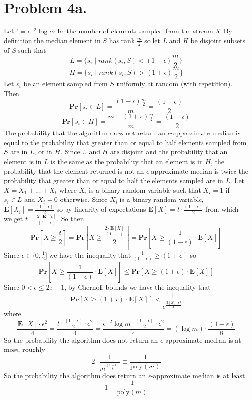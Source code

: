 \documentclass[12pt]{article}
\begin{document}
\section*{Problem 4a.}
Let $t=\epsilon^{-2} \log m$ be the number of elements
sampled from the stream $S$. By definition the median element in $S$ has rank
$\frac{m}{2}$ so let $L$ and $H$ be disjoint subsets of $S$ such that
$$L = \{s_i \mid rank(s_i, S) < (1-\epsilon)\frac{m}{2}\}$$
$$H = \{s_i \mid rank(s_i, S) > (1+\epsilon)\frac{m}{2}\}$$
Let $s_i$ be an element sampled from $S$ uniformly at random 
(with repetition). Then
$$\textbf{Pr}[s_i \in L] = \frac{(1-\epsilon)\frac{m}{2}}{m} =
\frac{(1-\epsilon)}{2}$$
$$\textbf{Pr}[s_i \in H] = \frac{m - (1+\epsilon)\frac{m}{2}}{m} =
\frac{(1-\epsilon)}{2}$$
The probability that the algorithm does not return an $\epsilon$-approximate
median is equal to the probability that greater than or equal to half
elements sampled from $S$ are in $L$, or in $H$. Since $L$ and $H$ are disjoint
and the probability that an element is in $L$ is the same as the probability
that an element is in $H$, the probability that the element returned
is not an $\epsilon$-approximate median is twice the probability that
greater than or equal to half the elements sampled are in $L$.
Let $X = X_1 + ... + X_t$ where $X_i$ is a binary random variable such
that $X_i = 1$ if $s_i \in L$ and $X_i = 0$ otherwise. Since $X_i$ is a binary
random variable, $\textbf{E}[X_i] = \frac{(1-\epsilon)}{2}$ so by linearity of
expectations $\textbf{E}[X] = t\cdot \frac{(1-\epsilon)}{2}$ from which we get
$t = \frac{2\cdot \textbf{E}[X]}{(1-\epsilon)}$. So then
$$\textbf{Pr}[X \ge \frac{t}{2}] =
\textbf{Pr}[X \ge \frac{\frac{2\cdot \textbf{E}[X]}{(1-\epsilon)}}{2}] =
\textbf{Pr}[X \ge \frac{1}{(1-\epsilon)}\cdot \textbf{E}[X]]$$
Since $\epsilon \in (0,\frac{1}{2}]$ we have the inequality that
$\frac{1}{(1-\epsilon)} \ge (1+\epsilon)$ so
$$\textbf{Pr}[X \ge \frac{1}{(1-\epsilon)}\cdot \textbf{E}[X]] \le
\textbf{Pr}[X \ge (1+\epsilon) \cdot \textbf{E}[X]]$$
Since $0 < \epsilon \le 2e - 1$, by Chernoff bounds we have the inequality that
$$\textbf{Pr}[X \ge (1+\epsilon) \cdot \textbf{E}[X]] <
\frac{1}{e^{\frac{\textbf{E}[X]\cdot \epsilon^2}{4}}}$$
where
$$\frac{\textbf{E}[X]\cdot \epsilon^2}{4} =
\frac{t\cdot \frac{(1-\epsilon)}{2} \cdot \epsilon^2}{4} =
\frac{\epsilon^{-2} \log m \cdot \frac{(1-\epsilon)}{2} \cdot \epsilon^2}{4} =
(\log m) \cdot \frac{(1-\epsilon)}{8}$$
So the probability the algorithm does not return an $\epsilon$-approximate
median is at most, roughly
$$2\cdot \frac{1}{m^{\frac{(1-\epsilon)}{8}}} \equiv \frac{1}{\text{poly}(m)}$$
So the probability the algorithm does return an $\epsilon$-approximate
median is at least
$$1 - \frac{1}{\text{poly}(m)}$$
\end{document}
